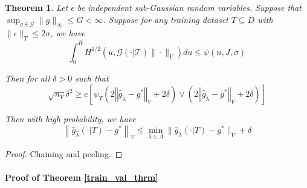 \documentclass[12pt]{article}
\newtheorem{theorem}{Theorem}
\begin{document}
\begin{theorem}
\label{train_val_thrm_complicated}
Let $\epsilon$ be independent sub-Gaussian random variables.
Suppose that $\sup_{g \in \mathcal{G}} \| g \|_\infty \le G < \infty$.
Suppose for any training dataset $T \subseteq D$ with $\| \epsilon \|_T \le 2 \sigma$, we have
\begin{equation}
\int_0^R H^{1/2} \left ( u, \mathcal{G(\cdot | T)} \| \cdot \|_V \right ) du \le \psi(n, J, \sigma)
\end{equation}

Then for all $\delta  > 0$ such that
\begin{equation}
\sqrt{n_{V}}\delta^{2}
\ge
c \left[
\psi_{T}\left(2\left\Vert \hat{g}_{\tilde{\lambda}}-g^{*}\right\Vert _{V} + 2\delta\right)
\vee
\left(2\left\Vert \hat{g}_{\tilde{\lambda}}-g^{*}\right\Vert _{V}+2\delta\right)
\right]
\end{equation}

Then with high probability, we have
\begin{equation}
\left \|\hat{g}_{\hat{\lambda} }(\cdot | T) - g^* \right \|_V
\le
\min_{\lambda \in \Lambda}\| \hat{g}_{\lambda}(\cdot | T) - g^*\|_V
+ \delta
\end{equation}
\end{theorem}

\begin{proof}
Chaining and peeling.
\end{proof}

%

\paragraph{Proof of Theorem \ref{train_val_thrm}}
\end{document}
